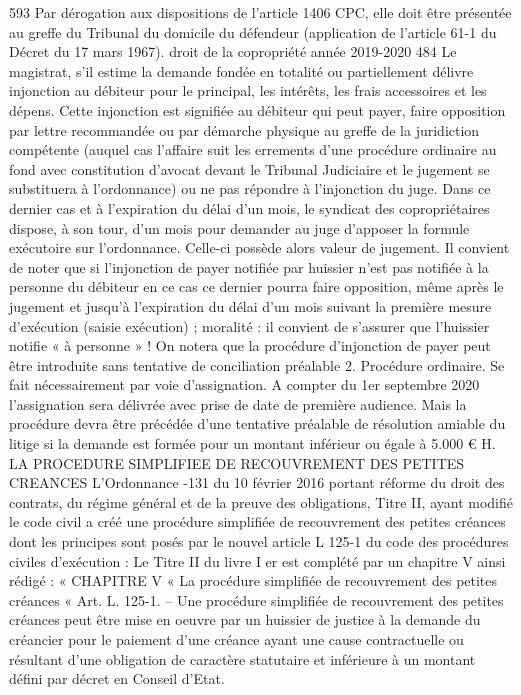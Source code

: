 593 Par dérogation aux dispositions de l’article 1406 CPC, elle doit être présentée au greffe du Tribunal du domicile du défendeur (application de l’article 61-1 du Décret du 17 mars 1967).
droit de la copropriété année 2019-2020
484
Le magistrat, s’il estime la demande fondée en totalité ou partiellement délivre injonction au débiteur pour le principal, les intérêts, les frais accessoires et les dépens. Cette injonction est signifiée au débiteur qui peut payer, faire opposition par lettre recommandée ou par démarche physique au greffe de la juridiction compétente (auquel cas l’affaire suit les errements d’une procédure ordinaire au fond avec constitution d’avocat devant le Tribunal Judiciaire et le jugement se substituera à l’ordonnance) ou ne pas répondre à l’injonction du juge.
Dans ce dernier cas et à l’expiration du délai d’un mois, le syndicat des copropriétaires dispose, à son tour, d'un mois pour demander au juge d'apposer la formule exécutoire sur l'ordonnance. Celle-ci possède alors valeur de jugement.
Il convient de noter que si l’injonction de payer notifiée par huissier n’est pas notifiée à la personne du débiteur en ce cas ce dernier pourra faire opposition, même après le jugement et jusqu’à l’expiration du délai d’un mois suivant la première mesure d’exécution (saisie exécution) ; moralité : il convient de s’assurer que l’huissier notifie « à personne » !
On notera que la procédure d’injonction de payer peut être introduite sans tentative de conciliation préalable
2. Procédure ordinaire.
Se fait nécessairement par voie d’assignation.
A compter du 1er septembre 2020 l’assignation sera délivrée avec prise de date de première audience.
Mais la procédure devra être précédée d’une tentative préalable de résolution amiable du litige si la demande est formée pour un montant inférieur ou égale à 5.000 €
H. LA PROCEDURE SIMPLIFIEE DE RECOUVREMENT DES PETITES CREANCES
L’Ordonnance -131 du 10 février 2016 portant réforme du droit des contrats, du régime général et de la preuve des obligations, Titre II, ayant modifié le code civil a créé une procédure simplifiée de recouvrement des petites créances dont les principes sont posés par le nouvel article L 125-1 du code des procédures civiles d’exécution :
Le Titre II du livre I er est complété par un chapitre V ainsi rédigé :
« CHAPITRE V « La procédure simplifiée de recouvrement des petites créances
« Art. L. 125-1. – Une procédure simplifiée de recouvrement des petites créances peut être mise en oeuvre par un huissier de justice à la demande du créancier pour le paiement d’une créance ayant une cause contractuelle ou résultant d’une obligation de caractère statutaire et inférieure à un montant défini par décret en Conseil d’Etat.
